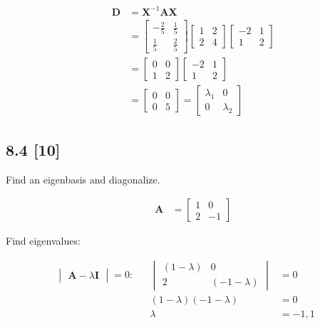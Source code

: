 \documentclass{article}
\begin{document}
\begin{align}
    \label{eq:22}
    && \textbf{D} &= \textbf{X}^{-1}\textbf{AX}
    \\
    \label{eq:23}
    && &= \begin{bmatrix}
    -\frac{2}{5} & \frac{1}{5}\\
    \frac{1}{5} & \frac{2}{5}
    \end{bmatrix} \begin{bmatrix}
    1&2\\2&4
    \end{bmatrix} \begin{bmatrix}
    -2 & 1\\1&2
    \end{bmatrix}
    \\
    \label{eq:24}
    && &= \begin{bmatrix}
    0 & 0 \\ 1 & 2
    \end{bmatrix} \begin{bmatrix}
    -2 & 1 \\ 1 & 2
    \end{bmatrix}
    \\
    \label{eq:25}
    && &= \begin{bmatrix}
    0 & 0\\ 0 & 5
    \end{bmatrix} = \begin{bmatrix}
    \lambda_1 & 0\\
    0 & \lambda_2
    \end{bmatrix}
\end{align}

\subsection*{8.4 [10]}
\setcounter{equation}{0}

Find an eigenbasis and diagonalize.

\begin{align}
    && \textbf{A} &= \begin{bmatrix}
    1 & 0\\2&-1
    \end{bmatrix}
\end{align}

Find eigenvalues:

\begin{align}
    \begin{vmatrix}
    \textbf{A} - \lambda\textbf{I}
    \end{vmatrix}=0: && \begin{vmatrix}
    (1-\lambda) & 0\\
    2 & (-1-\lambda)
    \end{vmatrix} &= 0
    \\
    &&(1-\lambda)(-1-\lambda) &= 0
    \\
    && \lambda&= -1, 1
\end{align}
\end{document}
